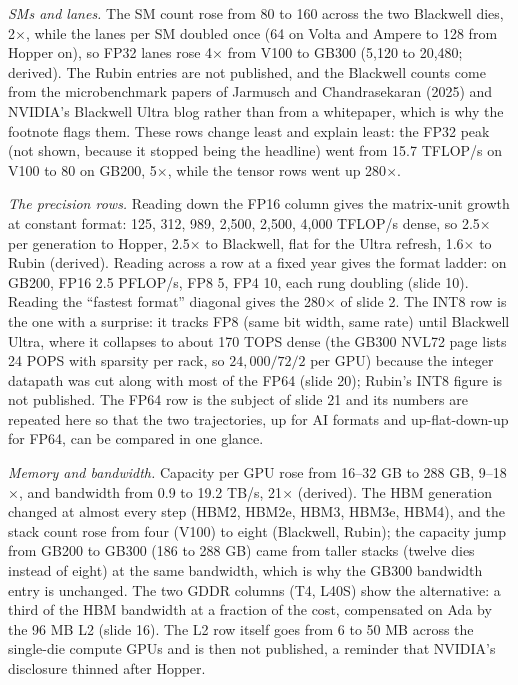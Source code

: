 \documentclass[11pt,letterpaper]{article}
\begin{document}
\emph{SMs and lanes.} The SM count rose from 80 to 160 across the two Blackwell dies, 2$\times$, while the lanes per SM doubled once (64 on Volta and Ampere to 128 from Hopper on), so FP32 lanes rose 4$\times$ from V100 to GB300 (5,120 to 20,480; derived). The Rubin entries are not published, and the Blackwell counts come from the microbenchmark papers of Jarmusch and Chandrasekaran (2025) and NVIDIA's Blackwell Ultra blog rather than from a whitepaper, which is why the footnote flags them. These rows change least and explain least: the FP32 peak (not shown, because it stopped being the headline) went from 15.7 TFLOP/s on V100 to 80 on GB200, 5$\times$, while the tensor rows went up 280$\times$.

\emph{The precision rows.} Reading down the FP16 column gives the matrix-unit growth at constant format: 125, 312, 989, 2,500, 2,500, 4,000 TFLOP/s dense, so 2.5$\times$ per generation to Hopper, 2.5$\times$ to Blackwell, flat for the Ultra refresh, 1.6$\times$ to Rubin (derived). Reading across a row at a fixed year gives the format ladder: on GB200, FP16 2.5 PFLOP/s, FP8 5, FP4 10, each rung doubling (slide 10). Reading the ``fastest format'' diagonal gives the 280$\times$ of slide 2. The INT8 row is the one with a surprise: it tracks FP8 (same bit width, same rate) until Blackwell Ultra, where it collapses to about 170 TOPS dense (the GB300 NVL72 page lists 24 POPS with sparsity per rack, so $24{,}000/72/2$ per GPU) because the integer datapath was cut along with most of the FP64 (slide 20); Rubin's INT8 figure is not published. The FP64 row is the subject of slide 21 and its numbers are repeated here so that the two trajectories, up for AI formats and up-flat-down-up for FP64, can be compared in one glance.

\emph{Memory and bandwidth.} Capacity per GPU rose from 16--32 GB to 288 GB, 9--18$\times$, and bandwidth from 0.9 to 19.2 TB/s, 21$\times$ (derived). The HBM generation changed at almost every step (HBM2, HBM2e, HBM3, HBM3e, HBM4), and the stack count rose from four (V100) to eight (Blackwell, Rubin); the capacity jump from GB200 to GB300 (186 to 288 GB) came from taller stacks (twelve dies instead of eight) at the same bandwidth, which is why the GB300 bandwidth entry is unchanged. The two GDDR columns (T4, L40S) show the alternative: a third of the HBM bandwidth at a fraction of the cost, compensated on Ada by the 96 MB L2 (slide 16). The L2 row itself goes from 6 to 50 MB across the single-die compute GPUs and is then not published, a reminder that NVIDIA's disclosure thinned after Hopper.
\end{document}

